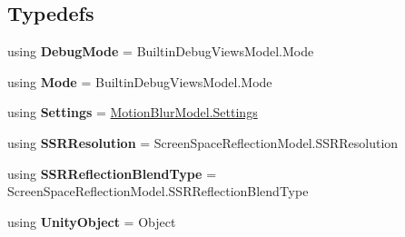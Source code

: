 \subsection*{Typedefs}
\begin{DoxyCompactItemize}
\item 
\mbox{\label{namespace_unity_engine_1_1_post_processing_ab2cfc5e1c58b5ee2672332ca96dcb2a0}} 
using {\bfseries Debug\+Mode} = Builtin\+Debug\+Views\+Model.\+Mode
\item 
\mbox{\label{namespace_unity_engine_1_1_post_processing_a39931777603dcd1a2aac4ffd3b137e62}} 
using {\bfseries Mode} = Builtin\+Debug\+Views\+Model.\+Mode
\item 
\mbox{\label{namespace_unity_engine_1_1_post_processing_a592ef3c37c37720c9148658370d5e39b}} 
using {\bfseries Settings} = \hyperlink{struct_unity_engine_1_1_post_processing_1_1_motion_blur_model_1_1_settings}{Motion\+Blur\+Model.\+Settings}
\item 
\mbox{\label{namespace_unity_engine_1_1_post_processing_a77cd6d8a0741cbfd993f74786b96c92f}} 
using {\bfseries S\+S\+R\+Resolution} = Screen\+Space\+Reflection\+Model.\+S\+S\+R\+Resolution
\item 
\mbox{\label{namespace_unity_engine_1_1_post_processing_ad79ff59bbe939b6e24585aaeabd4c356}} 
using {\bfseries S\+S\+R\+Reflection\+Blend\+Type} = Screen\+Space\+Reflection\+Model.\+S\+S\+R\+Reflection\+Blend\+Type
\item 
\mbox{\label{namespace_unity_engine_1_1_post_processing_a4d6b4edb7079fca849178803e29c49bb}} 
using {\bfseries Unity\+Object} = Object
\end{DoxyCompactItemize}
